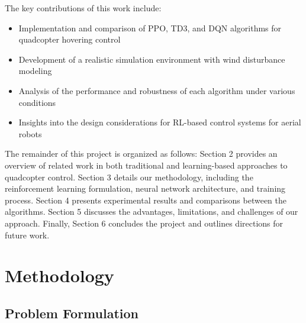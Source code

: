 \documentclass[12pt]{article}
\begin{document}
The key contributions of this work include:
\begin{itemize}
    \item Implementation and comparison of PPO, TD3, and DQN algorithms for quadcopter hovering control
    \item Development of a realistic simulation environment with wind disturbance modeling
    \item Analysis of the performance and robustness of each algorithm under various conditions
    \item Insights into the design considerations for RL-based control systems for aerial robots
\end{itemize}


The remainder of this project is organized as follows: Section 2 provides an overview of related work in both traditional and learning-based approaches to quadcopter control. Section 3 details our methodology, including the reinforcement learning formulation, neural network architecture, and training process. Section 4 presents experimental results and comparisons between the algorithms. Section 5 discusses the advantages, limitations, and challenges of our approach. Finally, Section 6 concludes the project and outlines directions for future work.



\section{Methodology}
\subsection{Problem Formulation}
\end{document}
